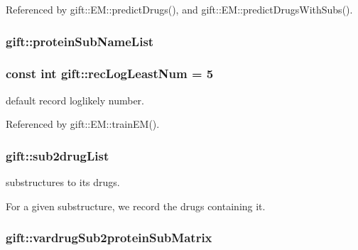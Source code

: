 Referenced by gift\+::\+E\+M\+::predict\+Drugs(), and gift\+::\+E\+M\+::predict\+Drugs\+With\+Subs().

\subsubsection[{\texorpdfstring{protein\+Sub\+Name\+List}{proteinSubNameList}}]{ gift\+::protein\+Sub\+Name\+List}\hypertarget{namespacegift_a55fa4ad0822bcbe5ca42f2962e111ef1}{}\label{namespacegift_a55fa4ad0822bcbe5ca42f2962e111ef1}
\subsubsection[{\texorpdfstring{rec\+Log\+Least\+Num}{recLogLeastNum}}]{\setlength{\rightskip}{0pt plus 5cm}const int gift\+::rec\+Log\+Least\+Num = 5}\hypertarget{namespacegift_ab632fcb7ab144fdde38c5a4154e2b5b7}{}\label{namespacegift_ab632fcb7ab144fdde38c5a4154e2b5b7}


default record loglikely number. 



Referenced by gift\+::\+E\+M\+::train\+E\+M().

\subsubsection[{\texorpdfstring{sub2drug\+List}{sub2drugList}}]{ gift\+::sub2drug\+List}\hypertarget{namespacegift_afcc3e6429fa4fef47fb34e30d2f0c6c4}{}\label{namespacegift_afcc3e6429fa4fef47fb34e30d2f0c6c4}


substructures to its drugs. 

For a given substructure, we record the drugs containing it. 
\subsubsection[{\texorpdfstring{vardrug\+Sub2protein\+Sub\+Matrix}{vardrugSub2proteinSubMatrix}}]{ gift\+::vardrug\+Sub2protein\+Sub\+Matrix}\hypertarget{namespacegift_a7191203810c7c52faceb69ac903e7899}{}\label{namespacegift_a7191203810c7c52faceb69ac903e7899}

